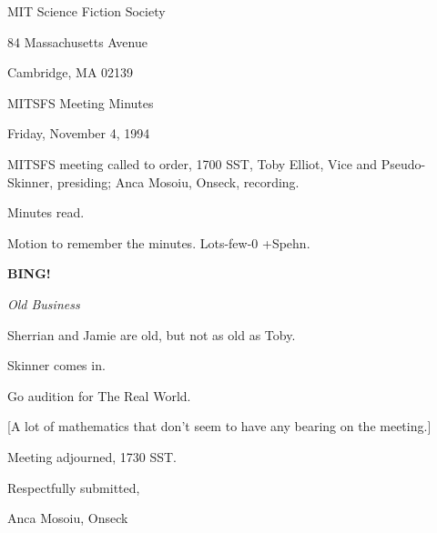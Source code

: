 \documentclass[12pt]{article}
\newcommand{\bing}{{\bf BING!} }
\newcommand{\goto}[1]{\bing \vskip 12pt \centerline{{\em{#1}}}}
\begin{document}
\begin{center}

MIT Science Fiction Society 

84 Massachusetts Avenue

Cambridge, MA 02139

\vspace{12pt}

MITSFS Meeting Minutes 

Friday, November 4, 1994

\end{center}
 
\vspace{18pt}

\setlength{\parskip}{6pt}

\noindent
MITSFS meeting called to order, 1700 SST,
Toby Elliot, Vice and Pseudo-Skinner, presiding; Anca Mosoiu, Onseck, recording.

Minutes read.

Motion to remember the minutes. Lots-few-0 +Spehn.

\goto{Old Business}

Sherrian and Jamie are old, but not as old as Toby.

Skinner comes in.

Go audition for The Real World.

[A lot of mathematics that don't seem to have any bearing on the meeting.]

\vspace{12pt}

\noindent
Meeting adjourned, 1730 SST.

\vspace{18pt}

\centerline{Respectfully submitted,}
\centerline{Anca Mosoiu, Onseck}
\end{document}
